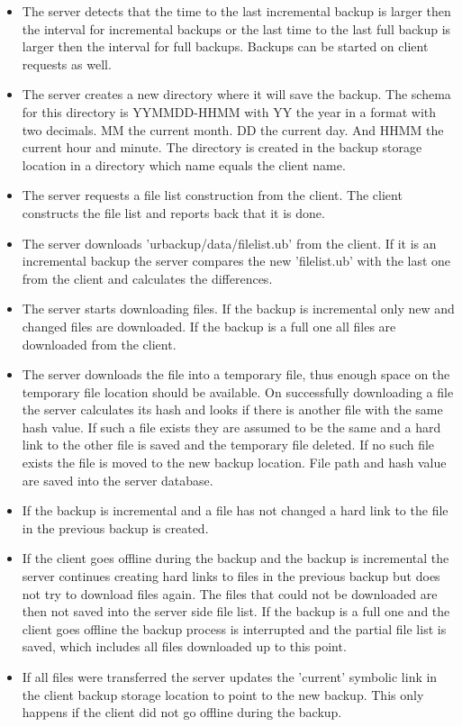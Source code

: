 \documentclass[a4paper,10pt]{article} \usepackage[breaklinks=true]{hyperref}
\begin{document}
\begin{itemize}
\item The server detects that the time to the last incremental backup is larger then the interval for incremental backups or the last time to the last full backup is larger then the interval for full backups. Backups can be started on client requests as well.
\item The server creates a new directory where it will save the backup. The schema for this directory is YYMMDD-HHMM with YY the year in a format with two decimals. MM the current month. DD the current day. And HHMM the current hour and minute. The directory is created in the backup storage location in a directory which name equals the client name.
\item The server requests a file list construction from the client. The client constructs the file list and reports back that it is done. 
\item The server downloads 'urbackup/data/filelist.ub' from the client. If it is an incremental backup the server compares the new 'filelist.ub' with the last one from the client and calculates the differences.
\item The server starts downloading files. If the backup is incremental only new and changed files are downloaded. If the backup is a full one all files are downloaded from the client.
\item The server downloads the file into a temporary file, thus enough space on the temporary file location should be available. On successfully downloading a file the server calculates its hash and looks if there is another file with the same hash value. If such a file exists they are assumed to be the same and a hard link to the other file is saved and the temporary file deleted. If no such file exists the file is moved to the new backup location. File path and hash value are saved into the server database.
\item If the backup is incremental and a file has not changed a hard link to the file in the previous backup is created.
\item If the client goes offline during the backup and the backup is incremental the server continues creating hard links to files in the previous backup but does not try to download files again. The files that could not be downloaded are then not saved into the server side file list. If the backup is a full one and the client goes offline the backup process is interrupted and the partial file list is saved, which includes all files downloaded up to this point.
\item If all files were transferred the server updates the 'current' symbolic link in the client backup storage location to point to the new backup. This only happens if the client did not go offline during the backup.
\end{itemize}
\end{document}
